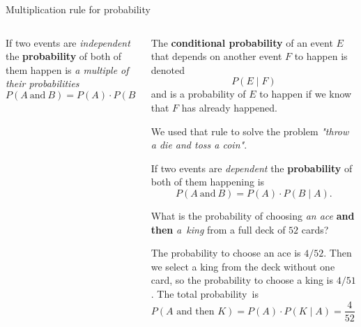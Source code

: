 \documentclass[9pt,aspectratio=169]{beamer}
\begin{document}
\begin{frame}{Multiplication rule for probability}
\begin{columns}[T]
\begin{column}{0.5\textwidth}
      \begin{definition}
        If two events are \emph{independent} the \textbf{probability} of both of them happen is \emph{a multiple of their probabilities}
        \[ P (A\ \text{and}\ B) = P (A) \cdot P (B). \] 
        \vspace*{-2ex} 
      \end{definition}
    \end{column}
    \begin{column}{0.5\textwidth}
      \begin{definition}
        The \textbf{conditional probability} of an event $E$ that depends on another event $F$ to happen is denoted 
        \[ P(E \mid F) \]
        and is a probability of $E$ to happen if we know that $F$ has already happened.
      \end{definition}
      {\small We used that rule to solve the problem \emph{"throw a die and toss a coin"}.}
      \begin{definition}
        If two events are \emph{dependent} the \textbf{probability} of both of them happening is
        \[ P (A\ \text{and}\ B) = P (A) \cdot P (B \mid A). \] 
        \vspace*{-2.5ex} 
      \end{definition}
      {\small
        \begin{problem}
          What is the probability of choosing \emph{an ace} \textbf{and then} \emph{a~king} from a full deck of $52$ cards?
        \end{problem}
        The probability to choose an ace is $4/52$. Then we select a king from the deck without one card, so the probability to choose a king is $4/51$. The total probability~is
        \[ P(A \text{ and then } K) = P(A) \cdot P(K \mid A) = \frac{4}{52} \cdot \frac{4}{51} = \frac{4}{663}. \]
      }
    \end{column}
  \end{columns}
\end{frame}
\end{document}
